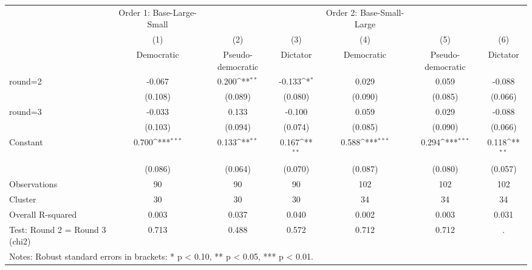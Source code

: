 {
\def\sym#1{\ifmmode^{#1}\else\(^{#1}\)\fi}
\begin{tabular}{l*{6}{c}}
\toprule
                    &Order 1: Base-Large-Small         &                     &                     &Order 2: Base-Small-Large         &                     &                     \\
                    &\multicolumn{1}{c}{(1)}&\multicolumn{1}{c}{(2)}&\multicolumn{1}{c}{(3)}&\multicolumn{1}{c}{(4)}&\multicolumn{1}{c}{(5)}&\multicolumn{1}{c}{(6)}\\
                    &\multicolumn{1}{c}{Democratic}&\multicolumn{1}{c}{Pseudo-democratic}&\multicolumn{1}{c}{Dictator}&\multicolumn{1}{c}{Democratic}&\multicolumn{1}{c}{Pseudo-democratic}&\multicolumn{1}{c}{Dictator}\\
\midrule
round=2             &      -0.067         &       0.200\sym{**} &      -0.133\sym{*}  &       0.029         &       0.059         &      -0.088         \\
                    &     (0.108)         &     (0.089)         &     (0.080)         &     (0.090)         &     (0.085)         &     (0.066)         \\
\addlinespace
round=3             &      -0.033         &       0.133         &      -0.100         &       0.059         &       0.029         &      -0.088         \\
                    &     (0.103)         &     (0.094)         &     (0.074)         &     (0.085)         &     (0.090)         &     (0.066)         \\
\addlinespace
Constant            &       0.700\sym{***}&       0.133\sym{**} &       0.167\sym{**} &       0.588\sym{***}&       0.294\sym{***}&       0.118\sym{**} \\
                    &     (0.086)         &     (0.064)         &     (0.070)         &     (0.087)         &     (0.080)         &     (0.057)         \\
\midrule
Observations        &          90         &          90         &          90         &         102         &         102         &         102         \\
Cluster             &          30         &          30         &          30         &          34         &          34         &          34         \\
Overall R-squared   &       0.003         &       0.037         &       0.040         &       0.002         &       0.003         &       0.031         \\
Test: Round 2 = Round 3 (chi2)&       0.713         &       0.488         &       0.572         &       0.712         &       0.712         &           .         \\
\bottomrule
\multicolumn{7}{l}{\footnotesize Notes: Robust standard errors in brackets: * p < 0.10, ** p < 0.05, *** p < 0.01.}\\
\end{tabular}
}

